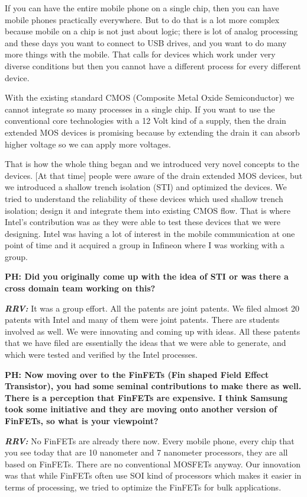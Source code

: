 \begin{multicols}{2}
If you can have the entire mobile phone on a single chip, then you can have mobile phones practically everywhere. But to do that is a lot more complex because mobile on a chip is not just about logic; there is lot of analog processing and these days you want to connect to USB drives, and you want to do many more things with the mobile.  That calls for devices which work under very diverse conditions but then you cannot have a different process for every different device.

With the existing standard CMOS (Composite Metal  Oxide Semiconductor) we cannot integrate so many processes in a single chip. If you want to use the conventional core technologies with a 12 Volt kind of a supply, then the drain extended MOS devices is promising because by extending the drain it can absorb higher voltage so we can apply more voltages.

That is how the whole thing began and we introduced very novel concepts to the devices. [At that time] people were aware of the drain extended MOS devices, but we introduced a shallow trench isolation (STI) and optimized the devices. We tried to understand the reliability of these devices which used shallow trench isolation; design it and integrate them into existing CMOS flow. That is where Intel’s contribution was as they were able to test these devices that we were designing. Intel was having a lot of interest in the mobile communication at one point of time and it acquired a group in Infineon where I was working with a group.

\textbf{PH: Did you originally come up with the idea of STI or was there a cross domain team working on this?}

\textbf{\textit{RRV:}} It was a group effort. All the patents are joint patents. We filed almost 20 patents with Intel and many of them were joint patents. There are students involved as well. We were innovating and coming up with ideas. All these patents that we have filed are essentially the ideas that we were able to generate, and which were tested and verified by the Intel processes.

\textbf{PH: Now moving over to the FinFETs (Fin shaped Field Effect Transistor), you had some seminal contributions to make there as well. There is a perception that FinFETs are expensive. I think Samsung took some initiative and they are moving onto another version of FinFETs, so what is your viewpoint?}

\textbf{\textit{RRV:}} No FinFETs are already there now. Every mobile phone, every chip that you see today that are 10 nanometer and 7 nanometer processors, they are all based on FinFETs. There are no conventional MOSFETs anyway. Our innovation was that while FinFETs often use SOI kind of processors which makes it easier in terms of processing, we tried to optimize the FinFETs for bulk applications.


\end{multicols}
